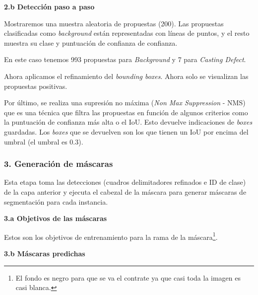 
\textbf{2.b Detección paso a paso\label{2_b_Detección_paso_a_paso}}

Mostraremos una muestra aleatoria de propuestas (200). Las propuestas clasificadas como \textit{background} están representadas con líneas de puntos, y el resto muestra su clase y puntuación de confianza de confianza.

En este caso tenemos 993 propuestas para \textit{Background} y 7 para \textit{Casting Defect}.


Ahora aplicamos el refinamiento del \textit{bounding boxes}. Ahora solo se visualizan las propuestas positivas.


Por último, se realiza una supresión no máxima (\textit{Non Max Suppression} - NMS) que es una técnica que filtra las propuestas en función de algunos criterios como la puntuación de confianza más alta o el IoU. Esto devuelve indicaciones de \textit{boxes} guardadas. Los \textit{boxes} que se devuelven son los que tienen un IoU por encima del umbral (el umbral es 0.3).


\subsubsection{3. Generación de máscaras\label{3_Generar_máscaras}}

Esta etapa toma las detecciones (cuadros delimitadores refinados e ID de clase) de la capa anterior y ejecuta el cabezal de la máscara para generar máscaras de segmentación para cada instancia.

\textbf{3.a Objetivos de las máscaras\label{3_a_Objetivos_de_las_máscaras}}

Estos son los objetivos de entrenamiento para la rama de la máscara\footnote{El fondo es negro para que se va el contrate ya que casi toda la imagen es casi blanca.}.


\textbf{3.b Máscaras predichas\label{3_b_Máscaras_previstas}}

